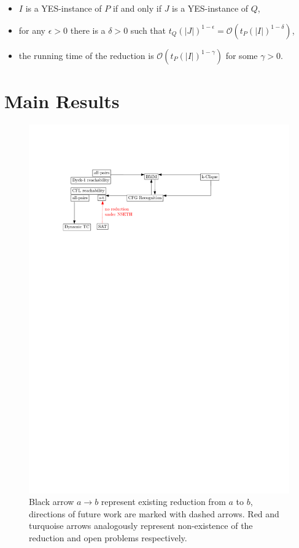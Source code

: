 \documentclass[acmsmall,review,nonacm]{acmart}\settopmatter{printfolios=true,printccs=false,printacmref=false}
\begin{document}
	\begin{itemize}
		\item $I$ is a YES-instance of $P$ if and only if $J$ is a YES-instance of $Q$,
		\item for any $\epsilon > 0$ there is a $\delta > 0$ such that $t_Q(|J|)^{1 - \epsilon} = \mathcal{O}(t_P (|I|)^{1 - \delta})$, 
		\item the running time of the reduction is $\mathcal{O}(t_P (|I|)^{1 - \gamma})$ for some $\gamma > 0$.
	\end{itemize}

	

	
	\section{Main Results}
	
	\begin{figure}[!htp]
		
		\begin{center}  
			\includegraphics[scale = 0.6]{map_popl.pdf}
		\end{center}
	
		\caption{Black arrow $a \rightarrow b$ represent existing reduction from $a$ to $b$, directions of future work are marked with dashed arrows. Red and turquoise arrows analogously represent non-existence of the reduction and open problems respectively. }
		
	\end{figure}
	
\end{document}
